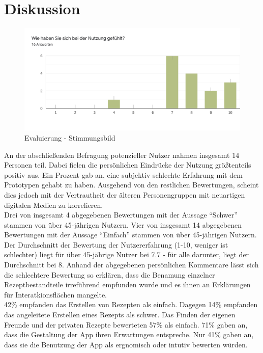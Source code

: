 \chapter{Diskussion}
\label{cha:Diskussion}
\begin{figure}[h] %
    \includegraphics[width=1\textwidth]{images/PersonlichesEmpfinden.png}
    \caption[Evaluierung - Stimmungsbild]{Evaluierung - Stimmungsbild}
    \label{fig:EvaluierungStimmungsbild}
\end{figure}
An der abschließenden Befragung potenzieller Nutzer nahmen insgesamt 14 Personen teil. Dabei fielen die persönlichen Eindrücke der Nutzung größtenteils positiv aus. Ein Prozent gab an, eine subjektiv schlechte Erfahrung mit dem Prototypen gehabt zu haben. Ausgehend von den restlichen Bewertungen, scheint dies jedoch mit der Vertrautheit der älteren Personengruppen mit neuartigen digitalen Medien zu korrelieren.\\ 
Drei von insgesamt 4 abgegebenen Bewertungen mit der Aussage {``Schwer''} stammen von über 45-jährigen Nutzern. 
Vier von insgesamt 14 abgegebenen Bewertungen mit der Aussage {``Einfach''} stammen von über 45-jährigen Nutzern. \\
Der Durchschnitt der Bewertung der Nutzererfahrung (1-10, weniger ist schlechter) liegt für über 45-jährige Nutzer bei 7.7 - für alle darunter, liegt der Durchschnitt bei 8. Anhand der abgegebenen persönlichen Kommentare lässt sich die schlechtere Bewertung so erklären, dass die Benamung einzelner Rezeptbestandteile irreführend empfunden wurde und es ihnen an Erklärungen für Interatkionsflächen mangelte.\\

42\% empfanden das Erstellen von Rezepten als einfach. Dagegen 14\% empfanden das angeleitete Erstellen eines Rezepts als schwer. Das Finden der eigenen Freunde und der privaten Rezepte bewerteten 57\% als einfach. 71\% gaben an, dass die Gestaltung der App ihren Erwartungen entspreche. Nur 41\%  gaben an, dass sie die Benutzung der App als ergnomisch oder intutiv bewerten würden. \\

